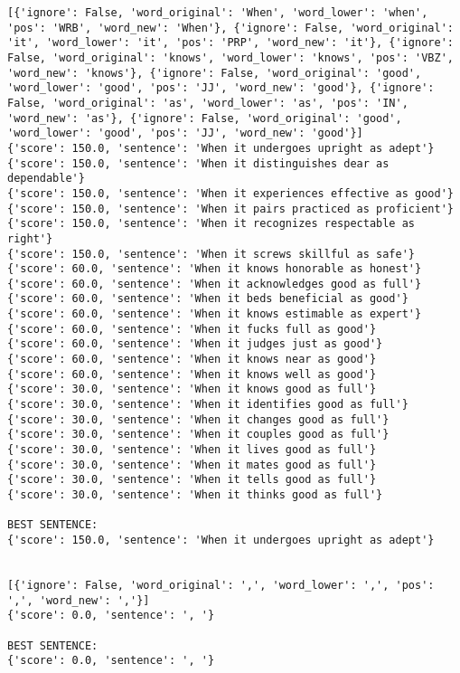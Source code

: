\documentclass[12pt,a4paper,oneside]{book}
\begin{document}
\begin{verbatim}
[{'ignore': False, 'word_original': 'When', 'word_lower': 'when', 'pos': 'WRB', 'word_new': 'When'}, {'ignore': False, 'word_original': 'it', 'word_lower': 'it', 'pos': 'PRP', 'word_new': 'it'}, {'ignore': False, 'word_original': 'knows', 'word_lower': 'knows', 'pos': 'VBZ', 'word_new': 'knows'}, {'ignore': False, 'word_original': 'good', 'word_lower': 'good', 'pos': 'JJ', 'word_new': 'good'}, {'ignore': False, 'word_original': 'as', 'word_lower': 'as', 'pos': 'IN', 'word_new': 'as'}, {'ignore': False, 'word_original': 'good', 'word_lower': 'good', 'pos': 'JJ', 'word_new': 'good'}]
{'score': 150.0, 'sentence': 'When it undergoes upright as adept'}
{'score': 150.0, 'sentence': 'When it distinguishes dear as dependable'}
{'score': 150.0, 'sentence': 'When it experiences effective as good'}
{'score': 150.0, 'sentence': 'When it pairs practiced as proficient'}
{'score': 150.0, 'sentence': 'When it recognizes respectable as right'}
{'score': 150.0, 'sentence': 'When it screws skillful as safe'}
{'score': 60.0, 'sentence': 'When it knows honorable as honest'}
{'score': 60.0, 'sentence': 'When it acknowledges good as full'}
{'score': 60.0, 'sentence': 'When it beds beneficial as good'}
{'score': 60.0, 'sentence': 'When it knows estimable as expert'}
{'score': 60.0, 'sentence': 'When it fucks full as good'}
{'score': 60.0, 'sentence': 'When it judges just as good'}
{'score': 60.0, 'sentence': 'When it knows near as good'}
{'score': 60.0, 'sentence': 'When it knows well as good'}
{'score': 30.0, 'sentence': 'When it knows good as full'}
{'score': 30.0, 'sentence': 'When it identifies good as full'}
{'score': 30.0, 'sentence': 'When it changes good as full'}
{'score': 30.0, 'sentence': 'When it couples good as full'}
{'score': 30.0, 'sentence': 'When it lives good as full'}
{'score': 30.0, 'sentence': 'When it mates good as full'}
{'score': 30.0, 'sentence': 'When it tells good as full'}
{'score': 30.0, 'sentence': 'When it thinks good as full'}

BEST SENTENCE:
{'score': 150.0, 'sentence': 'When it undergoes upright as adept'}


[{'ignore': False, 'word_original': ',', 'word_lower': ',', 'pos': ',', 'word_new': ','}]
{'score': 0.0, 'sentence': ', '}

BEST SENTENCE:
{'score': 0.0, 'sentence': ', '}



\end{verbatim}
\end{document}
